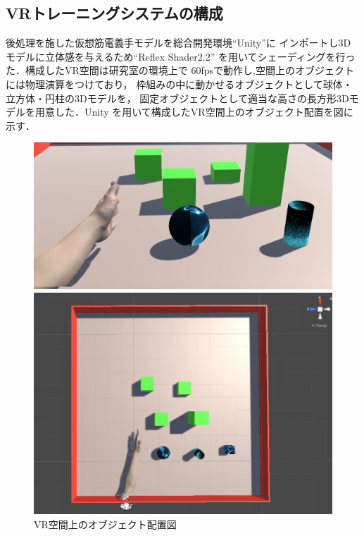 \documentclass{ltjsarticle}
\begin{document}
	\subsection{VRトレーニングシステムの構成}
		後処理を施した仮想筋電義手モデルを総合開発環境``Unity''に
		インポートし3Dモデルに立体感を与えるため``Reflex Shader2.2''
		を用いてシェーディングを行った．構成したVR空間は研究室の環境上で
		60fpsで動作し,空間上のオブジェクトには物理演算をつけており，
		枠組みの中に動かせるオブジェクトとして球体・立方体・円柱の3Dモデルを，
		固定オブジェクトとして適当な高さの長方形3Dモデルを用意した．Unity
		を用いて構成したVR空間上のオブジェクト配置を図に示す．

		\begin{figure}[H]
		\centering
		\begin{minipage}{0.521\columnwidth}
		\centering
		\includegraphics[width = \columnwidth]{figs/gamescreen.png}
		\end{minipage}
		\hspace{0.05\columnwidth}
		\begin{minipage}{0.4\columnwidth}
		\centering
		\includegraphics[width = \columnwidth]{figs/fieldup.png}
		\end{minipage}
		\vspace{-10pt}
		\caption{VR空間上のオブジェクト配置図}
		\label{fig:gamefield}
		\end{figure}
		\vspace{-20pt}
\end{document}
